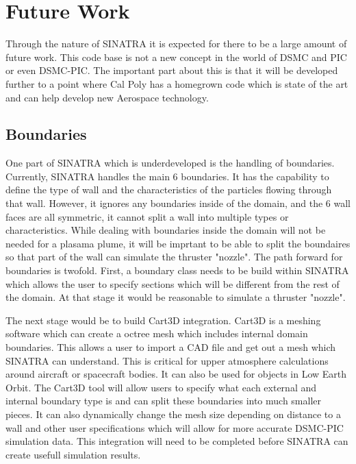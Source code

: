 \section{Future Work}

Through the nature of SINATRA it is expected for there to be a large amount of future work. This code base is not a new concept in the world of DSMC and PIC or even DSMC-PIC. The important part about this is that it will be developed further to a point where Cal Poly has a homegrown code which is state of the art and can help develop new Aerospace technology. 

\subsection{Boundaries}

One part of SINATRA which is underdeveloped is the handling of boundaries. Currently, SINATRA handles the main 6 boundaries. It has the capability to define the type of wall and the characteristics of the particles flowing through that wall. However, it ignores any boundaries inside of the domain, and the 6 wall faces are all symmetric, it cannot split a wall into multiple types or characteristics. While dealing with boundaries inside the domain will not be needed for a plasama plume, it will be imprtant to be able to split the boundaires so that part of the wall can simulate the thruster "nozzle". The path forward for boundaries is twofold. First, a boundary class needs to be build within SINATRA which allows the user to specify sections which will be different from the rest of the domain. At that stage it would be reasonable to simulate a thruster "nozzle". \par

\indent The next stage would be to build Cart3D integration. Cart3D is a meshing software which can create a octree mesh which includes internal domain boundaries. This allows a user to import a CAD file and get out a mesh which SINATRA can understand. This is critical for upper atmosphere calculations around aircraft or spacecraft bodies. It can also be used for objects in Low Earth Orbit. The Cart3D tool will allow users to specify what each external and internal boundary type is and can split these boundaries into much smaller pieces. It can also dynamically change the mesh size depending on distance to a wall and other user specifications which will allow for more accurate DSMC-PIC simulation data. This integration will need to be completed before SINATRA can create usefull simulation results. \par


